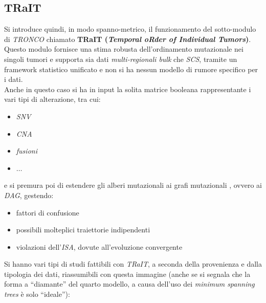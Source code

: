 \documentclass[a4paper,12pt, oneside]{book}
\begin{document}
\subsection{TRaIT}
Si introduce quindi, in modo spanno-metrico, il funzionamento del sotto-modulo
di \textit{TRONCO} chiamato \textbf{TRaIT (\textit{Temporal oRder
    of Individual Tumors})}.\\
Questo modulo fornisce una stima robusta dell'ordinamento mutazionale nei
singoli tumori e supporta sia dati \textit{multi-regionali bulk} che
\textit{SCS}, tramite un framework statistico unificato e non si ha nessun
modello di rumore specifico per i dati. \\
Anche in questo caso si ha in input la solita matrice booleana rappresentante i
vari tipi di alterazione, tra cui:
\begin{itemize}
  \item \textit{SNV}
  \item \textit{CNA}
  \item \textit{fusioni}
  \item $\ldots$
\end{itemize}
e si premura poi di estendere gli alberi mutazionali ai grafi mutazionali ,
ovvero ai \textit{DAG}, gestendo:
\begin{itemize}
  \item fattori di confusione
  \item possibili molteplici traiettorie indipendenti
  \item violazioni dell'\textit{ISA}, dovute all'evoluzione convergente 
\end{itemize}
Si hanno vari tipi di studi fattibili con \textit{TRaIT}, a seconda della
provenienza e dalla tipologia dei dati, riassumibili con questa immagine (anche
se si segnala che la forma a ``diamante'' del quarto modello, a causa dell'uso
dei \textit{minimum spanning trees} è solo ``ideale''):
\end{document}
